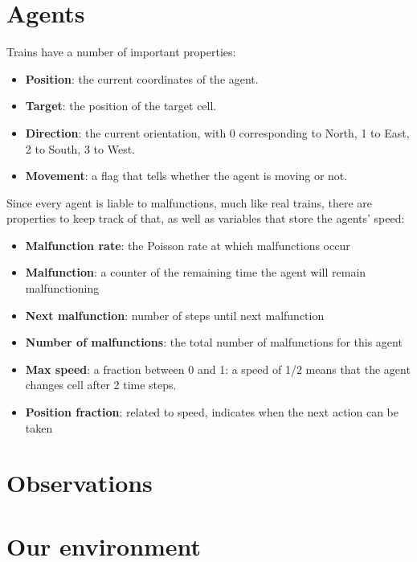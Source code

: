 \section{Agents}
Trains have a number of important properties:
\begin{itemize}
\item \textbf{Position}: the current coordinates of the agent.
\item \textbf{Target}: the position of the target cell.
\item \textbf{Direction}: the current orientation, with 0 corresponding to North, 1 to East, 2 to South, 3 to West. 
\item \textbf{Movement}: a flag that tells whether the agent is moving or not.
\end{itemize}
\noindent
Since every agent is liable to malfunctions, much like real trains, there are properties to keep track of that, as well as variables that store the agents' speed:
\begin{itemize}
\item 	\textbf{Malfunction rate}: the Poisson rate at which malfunctions occur
\item \textbf{Malfunction}: a counter of the remaining time the agent will remain malfunctioning
\item \textbf{Next malfunction}: number of steps until next malfunction
\item \textbf{Number of malfunctions}: the total number of malfunctions for this agent
\item \textbf{Max speed}: a fraction between 0 and 1: a speed of 1/2 means that the agent changes cell after 2 time steps.
\item \textbf{Position fraction}: related to speed, indicates when the next action can be taken
\end{itemize}

\section{Observations}

\section{Our environment}